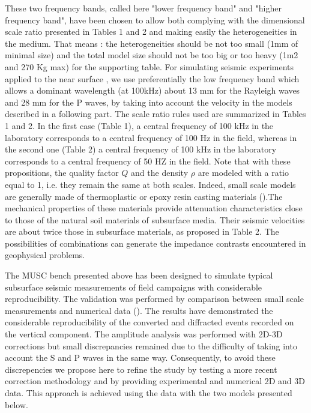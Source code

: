 \documentclass[extra,mreferee]{gji}
\begin{document}
These two frequency bands, called here "lower frequency band" and "higher frequency band", have been chosen to allow both complying with the dimensional scale ratio presented in Tables 1 and 2 and making easily the heterogeneities in the medium. That means : the heterogeneities should be not too small (1mm of minimal size) and the total model size should not be too big or too heavy (1m2 and 270 Kg max) for the supporting table. For simulating seismic experiments applied to the near surface , we use preferentially the low frequency band which allows a dominant wavelength (at 100kHz) about 13 mm for the Rayleigh waves and 28 mm for the P waves, by taking into account the velocity in the models described in a following part. The scale ratio rules used are summarized in Tables 1 and 2. In the first case (Table 1), a central frequency of 100 kHz in the laboratory corresponds to a central frequency of 100 Hz in the field, whereas in the second one (Table 2) a central frequency of 100 kHz in the laboratory corresponds to a central frequency of 50 HZ in the field. Note that with these propositions, the quality factor $Q$ and the density $\rho$ are modeled with a ratio equal to 1, i.e. they remain the same at both scales. Indeed, small scale models are generally made of thermoplastic or epoxy resin casting materials (\cite{bretaudeau2013fwi}).The mechanical properties of these materials provide attenuation characteristics close to those of the natural soil materials of subsurface media. Their seismic velocities are about twice those in subsurface materials, as proposed in Table 2. The possibilities of combinations can generate the impedance contrasts encountered in geophysical problems. 

The MUSC bench presented above has been designed to simulate typical subsurface seismic measurements of field campaigns with considerable reproducibility. The validation was performed by comparison between small scale measurements and numerical data (\cite{bretaudeau2011ssm}). The results have demonstrated the considerable reproducibility of the converted and diffracted events recorded on the vertical component. The amplitude analysis was performed with 2D-3D corrections but small discrepancies remained due to the difficulty of taking into account the S and P waves in the same way. Consequently, to avoid these discrepencies we propose here to refine the study by testing a more recent correction methodology \cite{schafer2014lss} and by providing experimental and numerical 2D and 3D data. This approach is achieved using the data with the two models presented below.
\end{document}
